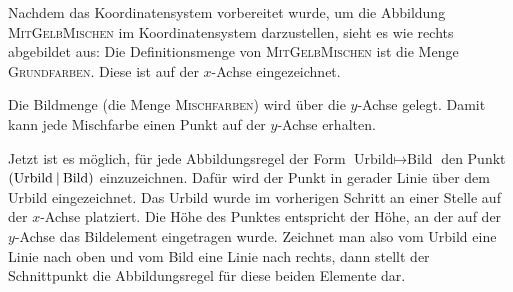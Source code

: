 \documentclass[../../main.tex]{subfiles}
\begin{document}
\begin{example}{}
    Nachdem das Koordinatensystem vorbereitet wurde, um die Abbildung \textsc{MitGelbMischen} im Koordinatensystem darzustellen, sieht es wie rechts abgebildet aus: Die Definitionsmenge von \textsc{MitGelbMischen} ist die Menge \textsc{Grundfarben}. Diese ist auf der $x$-Achse eingezeichnet.
    
    Die Bildmenge (die Menge \textsc{Mischfarben}) wird über die $y$-Achse gelegt. Damit kann jede Mischfarbe einen Punkt auf der $y$-Achse erhalten.
\end{example}

Jetzt ist es möglich, für jede Abbildungsregel der Form $\text{Urbild}\mapsto\text{Bild}$ den Punkt $\left(\text{Urbild} \:\middle|\: \text{Bild}\right)$ einzuzeichnen. Dafür wird der Punkt in gerader Linie über dem Urbild eingezeichnet. Das Urbild wurde im vorherigen Schritt an einer Stelle auf der $x$-Achse platziert. Die Höhe des Punktes entspricht der Höhe, an der auf der $y$-Achse das Bildelement eingetragen wurde. Zeichnet man also vom Urbild eine Linie nach oben und vom Bild eine Linie nach rechts, dann stellt der Schnittpunkt die Abbildungsregel für diese beiden Elemente dar.
\end{document}
